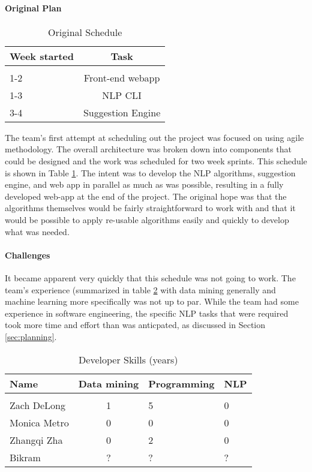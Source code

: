 
\paragraph{Original Plan}
\begin{table}[h]
\begin{center}
    \caption{Original Schedule}
    \begin{tabular}{ l c }
    \bf Week started & \bf Task \\ \hline \\
    1-2 & Front-end webapp  \\
    1-3 & NLP CLI  \\
    3-4 & Suggestion Engine 
    \end{tabular} \label{sec:devi-from-init-pln:original-timeline}
\end{center}
\end{table}

The team's first attempt at scheduling out the project was focused on
using agile methodology.  
The overall architecture was broken down into components that could be
designed and the work was scheduled for two week sprints.
This schedule is shown in Table
\ref{sec:devi-from-init-pln:original-timeline}.
The intent was to develop the NLP algorithms, suggestion engine, and
web app in parallel as much as was possible, resulting in a fully
developed web-app at the end of the project.
The original hope was that the algorithms themselves would be fairly
straightforward to work with and that it would be possible to apply
re-usable algorithms easily and quickly to develop what was needed.

\paragraph{Challenges}
It became apparent very quickly that this schedule was not going to
work.
The team's experience (summarized in table
\ref{sec:devi-from-init-pln:skillsets} with data mining generally and
machine learning more specifically was not up to par.
While the team had some experience in software engineering, the
specific NLP tasks that were required took more time and effort than
was anticpated, as discussed in Section \ref{sec:planning}.

\begin{table}[h]
    \caption{Developer Skills (years)}
    \begin{tabular}{ l c l l}
    \bf Name & \bf Data mining & \bf Programming & \bf NLP\\ \hline \\
    Zach DeLong & 1 & 5 & 0 \\
    Monica Metro &  0 & 0 & 0 \\
    Zhangqi Zha & 0 & 2 & 0\\
    Bikram & ? & ? & ?  
    \end{tabular} \label{sec:devi-from-init-pln:skillsets}
\end{table}

